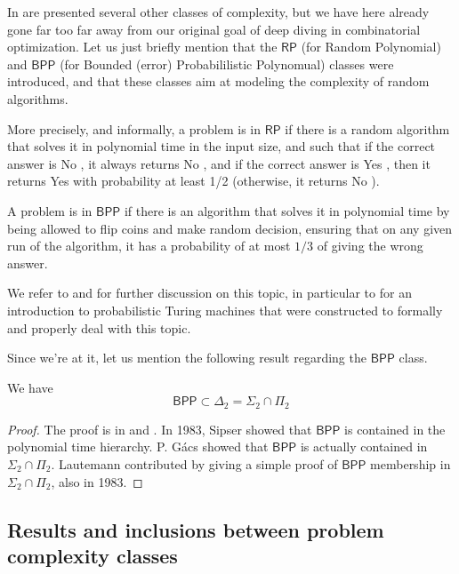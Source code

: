 \begin{remark}
    In \cite{gowers2024} are presented several other classes of complexity, but we have here already gone far too far away from our original goal of deep diving in combinatorial optimization. Let us just briefly mention that the $ \mathsf{RP} $ (for Random Polynomial) and $ \mathsf{BPP} $ (for Bounded (error) Probabililistic Polynomual) classes were introduced, and that these classes aim at modeling the complexity of random algorithms.

    More precisely, and informally, a problem is in $ \mathsf{RP} $ if there is a random algorithm that solves it in polynomial time in the input size, and such that if the correct answer is \og No \fg, it always returns \og No \fg, and if the correct answer is \og Yes \fg, then it returns \og Yes \fg with probability at least 1/2 (otherwise, it returns \og No \fg).

    A problem is in $ \mathsf{BPP} $ if there is an algorithm that solves it in polynomial time by being allowed to flip coins and make random decision, ensuring that on any given run of the algorithm, it has a probability of at most $ 1/3 $ of giving the wrong answer.

    We refer to \cite{sipser1996} and \cite{arora2009} for further discussion on this topic, in particular to \cite{wikiproba} for an introduction to probabilistic Turing machines that were constructed to formally and properly deal with this topic.
\end{remark}

Since we're at it, let us mention the following result regarding the $ \mathsf{BPP} $ class.

\begin{theorem}
    We have
    \[
        \mathsf{BPP} \subset \Delta_2 = \mathsf \Sigma_2 \cap \mathsf \Pi_2
    \]
\end{theorem}

\begin{proof}
    The proof is in \cite{sipser1983} and \cite{lautemann1983}. In 1983, Sipser \cite{sipser1983} showed that $ \mathsf{BPP} $ is contained in the polynomial time hierarchy. P. Gács showed that $ \mathsf{BPP} $ is actually contained in $ \mathsf \Sigma_2 \cap \mathsf \Pi_2 $. Lautemann contributed by giving a simple proof of $ \mathsf{BPP} $ \cite{lautemann1983} membership in $ \mathsf \Sigma_2 \cap \mathsf \Pi_2 $, also in 1983.
\end{proof}

\subsection{Results and inclusions between problem complexity classes}


